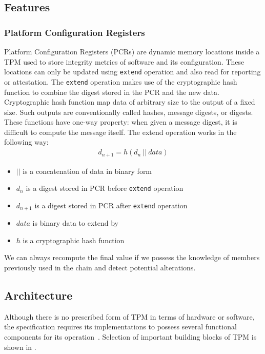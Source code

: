 \subsection{Features}

\subsubsection{Platform Configuration Registers}\label{sec:pcr}
Platform Configuration Registers (PCRs) are dynamic memory locations inside a TPM used to store integrity metrics of software and its configuration. These locations can only be updated using \texttt{extend} operation and also read for reporting or attestation. The \texttt{extend} operation makes use of the cryptographic hash function to combine the digest stored in the PCR and the new data. Cryptographic hash function map data of arbitrary size to the output of a fixed size. Such outputs are conventionally called hashes, message digests, or digests. These functions have one-way property: when given a message digest, it is difficult  to compute the message itself. The extend operation works in the following way:
\begin{align*}
    d_{n+1} = h(d_{n}\ ||\ data)
\end{align*}
\begin{itemize}
    \item $||$ is a concatenation of data in binary form
    \item $ d_{n} $ is a digest stored in PCR before \texttt{extend} operation
    \item $ d_{n+1} $ is a digest stored in PCR after \texttt{extend} operation
    \item $ data $ is binary data to extend by
    \item $ h $ is a cryptographic hash function
\end{itemize}

We can always recompute the final value if we possess the knowledge of members previously used in the chain and detect potential alterations.




\subsection{Architecture}
Although there is no prescribed form of TPM in terms of hardware or software, the specification requires its implementations to possess several functional components for its operation~\cite{tcg_p1_architecture}. Selection of important building blocks of TPM is shown in .

